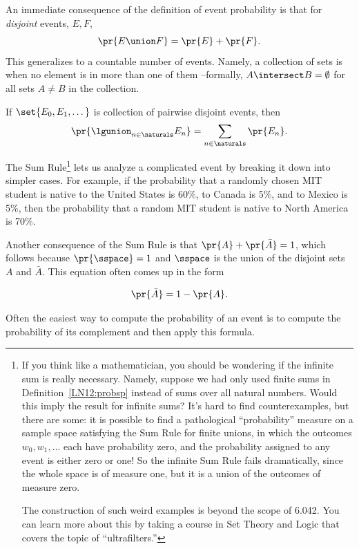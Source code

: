 An immediate consequence of the definition of event probability is that
for \emph{disjoint} events, $E,F$,
\[
\pr{E \union F} = \pr{E} + \pr{F}.
\]
This generalizes to a countable number of events.  Namely, a collection of
sets is  when no element is in more than one of
them --formally, $A \intersect B = \emptyset$ for all sets $A \neq B$ in
the collection.

\begin{rul*}  
  If $\set{E_0,E_1,\dots}$ is collection of pairwise disjoint events, then
\[
\pr{\lgunion_{n\in\naturals}E_n} = \sum_{n\in\naturals} \pr{E_n}.
\]
\end{rul*}

The Sum Rule\footnote{If you think like a mathematician, you should be
   wondering if the infinite sum is really necessary.  Namely, suppose we
   had only used finite sums in Definition~\ref{LN12:probsp} instead of sums
   over all natural numbers.  Would this imply the result for infinite
   sums?  It's hard to find counterexamples, but there are some: it is
   possible to find a pathological ``probability'' measure on a sample
   space satisfying the Sum Rule for finite unions, in which the outcomes
   $w_0,w_1,\dots$ each have probability zero, and the probability
   assigned to any event is either zero or one!  So the infinite Sum Rule
   fails dramatically, since the whole space is of measure one, but it is
   a union of the outcomes of measure zero.

   The construction of such weird examples is beyond the scope of 6.042.  You
   can learn more about this by taking a course in Set Theory and Logic that
   covers the topic of ``ultrafilters.''}
lets us analyze a complicated event by breaking it down into simpler
cases.  For example, if the probability that a randomly chosen MIT student
is native to the United States is 60\%, to Canada is 5\%, and to Mexico is
5\%, then the probability that a random MIT student is native to North
America is 70\%.

Another consequence of the Sum Rule is that $\pr{A} + \pr{\bar{A}} = 1$,
which follows because $\pr{\sspace}=1$ and $\sspace$ is the union of the
disjoint sets $A$ and $\bar{A}$.  This equation often comes up in the form
\begin{rul*} 
\[
\pr{\bar{A}}  =  1 - \pr{A}.
\]
\end{rul*}
Often the easiest way to compute the probability of an event is to compute
the probability of its complement and then apply this formula.

